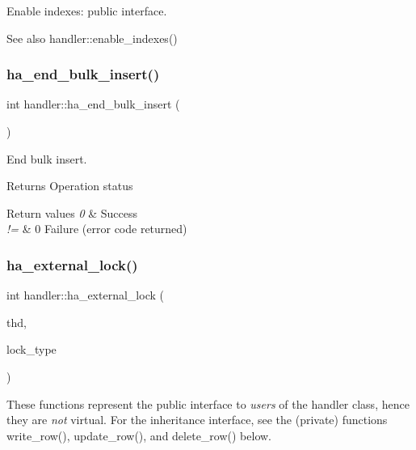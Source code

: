 Enable indexes\+: public interface.

\begin{DoxySeeAlso}{See also}
handler\+::enable\+\_\+indexes() 
\end{DoxySeeAlso}
\mbox{\label{classhandler_a30f3cbf4a769155c994ed39f76433106}} 
\subsubsection{\texorpdfstring{ha\+\_\+end\+\_\+bulk\+\_\+insert()}{ha\_end\_bulk\_insert()}}
{\footnotesize\ttfamily int handler\+::ha\+\_\+end\+\_\+bulk\+\_\+insert (\begin{DoxyParamCaption}{ }\end{DoxyParamCaption})}

End bulk insert.

\begin{DoxyReturn}{Returns}
Operation status 
\end{DoxyReturn}

\begin{DoxyRetVals}{Return values}
{\em 0} & Success \\
\hline
{\em !=} & 0 Failure (error code returned) \\
\hline
\end{DoxyRetVals}
\mbox{\label{classhandler_a9a99b5f8ae28bc5c374919396f8dcf08}} 
\subsubsection{\texorpdfstring{ha\+\_\+external\+\_\+lock()}{ha\_external\_lock()}}
{\footnotesize\ttfamily int handler\+::ha\+\_\+external\+\_\+lock (\begin{DoxyParamCaption}\item[{T\+HD $\ast$}]{thd,  }\item[{int}]{lock\+\_\+type }\end{DoxyParamCaption})}

These functions represent the public interface to {\itshape users} of the handler class, hence they are {\itshape not} virtual. For the inheritance interface, see the (private) functions write\+\_\+row(), update\+\_\+row(), and delete\+\_\+row() below. \mbox{\label{classhandler_afa6bd01057c6cdd86d2ea2ee4ea65ca3}} 
